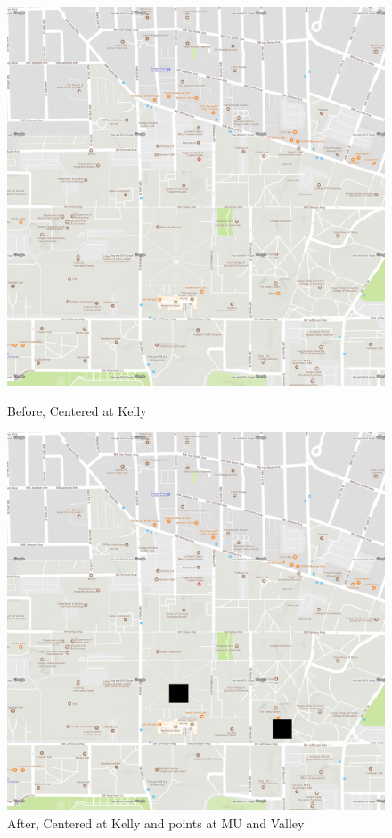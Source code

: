 \begin{figure}[ht!]
\begin{minipage}[t]{.45\linewidth}\centering
\includegraphics[width=\linewidth]{figures/unzoomed}
\caption{Before, Centered at Kelly}
\end{minipage}\hfill
\begin{minipage}[t]{.45\linewidth}\centering
\includegraphics[width=\linewidth]{figures/centered}
\caption{After, Centered at Kelly and points at MU and Valley}
\end{minipage}
\end{figure}
